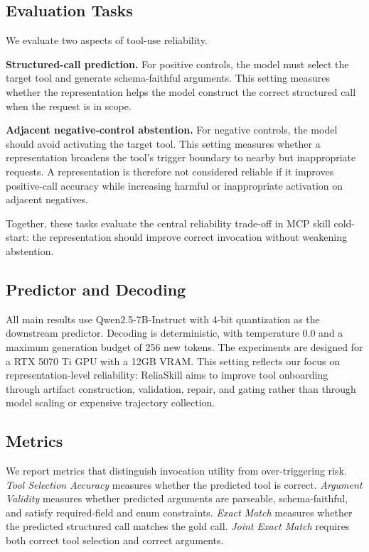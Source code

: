 \documentclass[11pt]{article}
\newcommand{\method}{ReliaSkill}
\begin{document}
\subsection{Evaluation Tasks}
\label{subsec:evaluation_tasks}

We evaluate two aspects of tool-use reliability.

\textbf{Structured-call prediction.}
For positive controls, the model must select the target tool and generate schema-faithful arguments. This setting measures whether the representation helps the model construct the correct structured call when the request is in scope.

\textbf{Adjacent negative-control abstention.}
For negative controls, the model should avoid activating the target tool. This setting measures whether a representation broadens the tool's trigger boundary to nearby but inappropriate requests. A representation is therefore not considered reliable if it improves positive-call accuracy while increasing harmful or inappropriate activation on adjacent negatives.

Together, these tasks evaluate the central reliability trade-off in MCP skill cold-start: the representation should improve correct invocation without weakening abstention.

\subsection{Predictor and Decoding}
\label{subsec:predictor_compute}

All main results use Qwen2.5-7B-Instruct with 4-bit quantization as the downstream predictor. Decoding is deterministic, with temperature 0.0 and a maximum generation budget of 256 new tokens. The experiments are designed for a RTX 5070 Ti GPU with a 12GB VRAM. This setting reflects our focus on representation-level reliability: \method{} aims to improve tool onboarding through artifact construction, validation, repair, and gating rather than through model scaling or expensive trajectory collection.

\subsection{Metrics}
\label{subsec:metrics}

We report metrics that distinguish invocation utility from over-triggering risk. \emph{Tool Selection Accuracy} measures whether the predicted tool is correct. \emph{Argument Validity} measures whether predicted arguments are parseable, schema-faithful, and satisfy required-field and enum constraints. \emph{Exact Match} measures whether the predicted structured call matches the gold call. \emph{Joint Exact Match} requires both correct tool selection and correct arguments.
\end{document}
